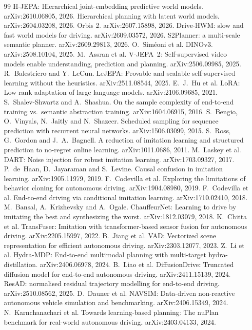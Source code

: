 \documentclass[10pt,twocolumn]{article}
\theoremstyle{remark}
\begin{document}
\begin{thebibliography}{99}\small
{} H-JEPA: Hierarchical joint-embedding predictive world models. arXiv:2610.06805, 2026.
 Hierarchical planning with latent world models. arXiv:2604.03208, 2026.
 Orbis 2. arXiv:2607.15898, 2026.
 Drive-HWM: slow and fast world models for driving. arXiv:2609.03572, 2026.
 S2Planner: a multi-scale semantic planner. arXiv:2609.29813, 2026.
 O.~Sim\'eoni et al. DINOv3. arXiv:2508.10104, 2025.
 M.~Assran et al. V-JEPA~2: Self-supervised video models enable understanding, prediction and planning. arXiv:2506.09985, 2025.
 R.~Balestriero and Y.~LeCun. LeJEPA: Provable and scalable self-supervised learning without the heuristics. arXiv:2511.08544, 2025.
 E.~J.~Hu et al. LoRA: Low-rank adaptation of large language models. arXiv:2106.09685, 2021.
 S.~Shalev-Shwartz and A.~Shashua. On the sample complexity of end-to-end training vs.\ semantic abstraction training. arXiv:1604.06915, 2016.
 S.~Bengio, O.~Vinyals, N.~Jaitly and N.~Shazeer. Scheduled sampling for sequence prediction with recurrent neural networks. arXiv:1506.03099, 2015.
 S.~Ross, G.~Gordon and J.~A.~Bagnell. A reduction of imitation learning and structured prediction to no-regret online learning. arXiv:1011.0686, 2011.
 M.~Laskey et al. DART: Noise injection for robust imitation learning. arXiv:1703.09327, 2017.
 P.~de~Haan, D.~Jayaraman and S.~Levine. Causal confusion in imitation learning. arXiv:1905.11979, 2019.
 F.~Codevilla et al. Exploring the limitations of behavior cloning for autonomous driving. arXiv:1904.08980, 2019.
 F.~Codevilla et al. End-to-end driving via conditional imitation learning. arXiv:1710.02410, 2018.
 M.~Bansal, A.~Krizhevsky and A.~Ogale. ChauffeurNet: Learning to drive by imitating the best and synthesizing the worst. arXiv:1812.03079, 2018.
 K.~Chitta et al. TransFuser: Imitation with transformer-based sensor fusion for autonomous driving. arXiv:2205.15997, 2022.
 B.~Jiang et al. VAD: Vectorized scene representation for efficient autonomous driving. arXiv:2303.12077, 2023.
 Z.~Li et al. Hydra-MDP: End-to-end multimodal planning with multi-target hydra-distillation. arXiv:2406.06978, 2024.
 B.~Liao et al. DiffusionDrive: Truncated diffusion model for end-to-end autonomous driving. arXiv:2411.15139, 2024.
 ResAD: normalised residual trajectory modelling for end-to-end driving. arXiv:2510.08562, 2025.
 D.~Dauner et al. NAVSIM: Data-driven non-reactive autonomous vehicle simulation and benchmarking. arXiv:2406.15349, 2024.
 N.~Karnchanachari et al. Towards learning-based planning: The nuPlan benchmark for real-world autonomous driving. arXiv:2403.04133, 2024.
\end{thebibliography}
\end{document}
